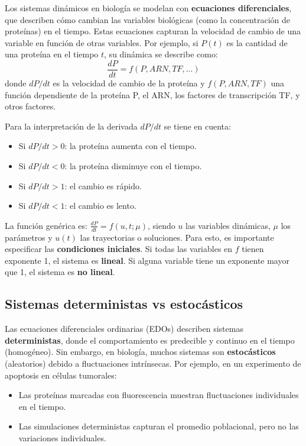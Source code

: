 Los sistemas dinámicos en biología se modelan con \textbf{ecuaciones diferenciales}, que describen cómo cambian las variables biológicas (como la concentración de proteínas) en el tiempo. Estas ecuaciones capturan la velocidad de cambio de una variable en función de otras variables. Por ejemplo, si $P(t)$ es la cantidad de una proteína en el tiempo $t$, su dinámica se describe como:
$$\frac{dP}{dt} = f(P, ARN, TF, ...)$$
donde $dP/dt$ es la velocidad de cambio de la proteína y $f(P, ARN, TF)$ una función dependiente de la proteína P, el ARN, los factores de transcripción TF, y otros factores.

Para la interpretación de la derivada $dP/dt$ se tiene en cuenta:
\begin{itemize}
\item Si $dP/dt > 0$: la proteína aumenta con el tiempo.
\item Si $dP/dt < 0$: la proteína disminuye con el tiempo.
\item Si $dP/dt > 1$: el cambio es rápido.
\item Si $dP/dt < 1$: el cambio es lento.
\end{itemize}

La función genérica es: $\frac{dP}{dt} = f(u, t; \mu)$, siendo $u$ las variables dinámicas, $\mu$ los parámetros y $u(t)$ las trayectorias o soluciones. Para esto, es importante especificar las \textbf{condiciones iniciales}. Si todas las variables en $f$ tienen exponente 1, el sistema es \textbf{lineal}. Si alguna variable tiene un exponente mayor que 1, el sistema es \textbf{no lineal}.

\subsection{Sistemas deterministas vs estocásticos}
Las ecuaciones diferenciales ordinarias (EDOs) describen sistemas \textbf{deterministas}, donde el comportamiento es predecible y continuo en el tiempo (homogéneo). Sin embargo, en biología, muchos sistemas son \textbf{estocásticos} (aleatorios) debido a fluctuaciones intrínsecas. Por ejemplo, en un experimento de apoptosis en células tumorales:
\begin{itemize}
\item Las proteínas marcadas con fluorescencia muestran fluctuaciones individuales en el tiempo.
\item Las simulaciones deterministas capturan el promedio poblacional, pero no las variaciones individuales.
\end{itemize}

